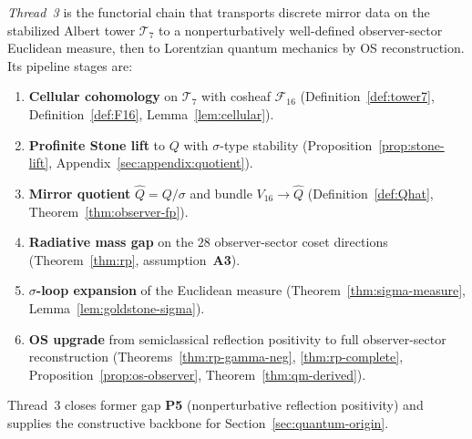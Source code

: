 \begin{definition}
\label{def:thread-3}
\emph{Thread~3} is the functorial chain that transports discrete mirror data
on the stabilized Albert tower $\mathcal{T}_7$ to a nonperturbatively
well-defined observer-sector Euclidean measure, then to Lorentzian quantum
mechanics by OS reconstruction. Its pipeline stages are:
\begin{enumerate}[label=(\roman*),leftmargin=*]
  \item \textbf{Cellular cohomology} on $\mathcal{T}_7$ with cosheaf
    $\mathcal{F}_{16}$ (Definition~\ref{def:tower7},
    Definition~\ref{def:F16}, Lemma~\ref{lem:cellular}).
  \item \textbf{Profinite Stone lift} to $Q$ with $\sigma$-type stability
    (Proposition~\ref{prop:stone-lift}, Appendix~\ref{sec:appendix:quotient}).
  \item \textbf{Mirror quotient} $\hat Q=Q/\sigma$ and bundle $V_{16}\to\hat Q$
    (Definition~\ref{def:Qhat}, Theorem~\ref{thm:observer-fp}).
  \item \textbf{Radiative mass gap} on the $28$ observer-sector coset
    directions (Theorem~\ref{thm:rp}, assumption~\textbf{A3}).
  \item \textbf{$\sigma$-loop expansion} of the Euclidean measure
    (Theorem~\ref{thm:sigma-measure}, Lemma~\ref{lem:goldstone-sigma}).
  \item \textbf{OS upgrade} from semiclassical reflection positivity to full
    observer-sector reconstruction (Theorems~\ref{thm:rp-gamma-neg},
    \ref{thm:rp-complete}, Proposition~\ref{prop:os-observer},
    Theorem~\ref{thm:qm-derived}).
\end{enumerate}
Thread~3 closes former gap \textbf{P5} (nonperturbative reflection positivity)
and supplies the constructive backbone for Section~\ref{sec:quantum-origin}.
\end{definition}

